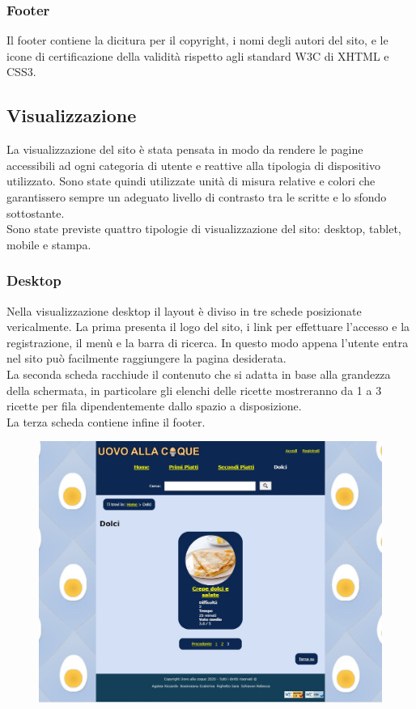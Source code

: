 \subsubsection{Footer}
\label{ssub:footer}
Il footer contiene la dicitura per il copyright, i nomi degli autori del sito, e le icone di certificazione della validità rispetto agli standard W3C di XHTML e CSS3.

\subsection{Visualizzazione} %
\label{sub:visualizzazione}
La visualizzazione del sito è stata pensata in modo da rendere le pagine accessibili ad ogni categoria di utente e reattive alla tipologia di dispositivo utilizzato. Sono state quindi utilizzate unità di misura relative e colori che garantissero sempre un adeguato livello di contrasto tra le scritte e lo sfondo sottostante. \\
Sono state previste quattro tipologie di visualizzazione del sito: desktop, tablet, mobile e stampa.

\subsubsection{Desktop}
\label{ssub:desktop}
Nella visualizzazione desktop il layout è diviso in tre schede posizionate vericalmente. La prima presenta il logo del sito, i link per effettuare l'accesso e la registrazione, il menù e la barra di ricerca. In questo modo appena l'utente entra nel sito può facilmente raggiungere la pagina desiderata. \\
La seconda scheda racchiude il contenuto che si adatta in base alla grandezza della schermata, in particolare gli elenchi delle ricette mostreranno da 1 a 3 ricette per fila dipendentemente dallo spazio a disposizione. \\
La terza scheda contiene infine il footer.  
\begin{figure}[H]
	\centering
	\includegraphics[width=16cm]{img/progettazione/desktop.jpg}
\end{figure}
